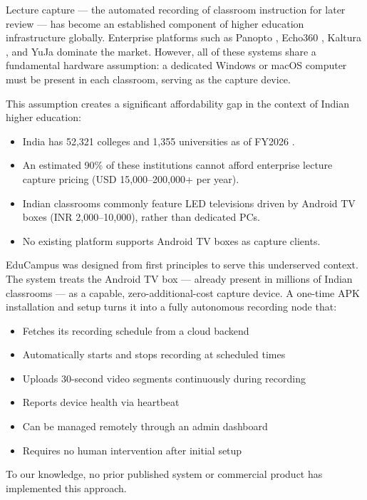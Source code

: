 \documentclass[12pt,a4paper]{article}
\begin{document}
Lecture capture — the automated recording of classroom instruction for later review — has become an established component of higher education infrastructure globally. Enterprise platforms such as Panopto \cite{panopto2024}, Echo360 \cite{echo360}, Kaltura \cite{kaltura}, and YuJa \cite{yuja} dominate the market. However, all of these systems share a fundamental hardware assumption: a dedicated Windows or macOS computer must be present in each classroom, serving as the capture device.

This assumption creates a significant affordability gap in the context of Indian higher education:

\begin{itemize}
    \item India has 52{,}321 colleges and 1{,}355 universities as of FY2026 \cite{ibef2024}.
    \item An estimated 90\% of these institutions cannot afford enterprise lecture capture pricing (USD 15{,}000--200{,}000+ per year).
    \item Indian classrooms commonly feature LED televisions driven by Android TV boxes (INR 2{,}000--10{,}000), rather than dedicated PCs.
    \item No existing platform supports Android TV boxes as capture clients.
\end{itemize}

EduCampus was designed from first principles to serve this underserved context. The system treats the Android TV box --- already present in millions of Indian classrooms --- as a capable, zero-additional-cost capture device. A one-time APK installation and setup turns it into a fully autonomous recording node that:

\begin{itemize}
    \item Fetches its recording schedule from a cloud backend
    \item Automatically starts and stops recording at scheduled times
    \item Uploads 30-second video segments continuously during recording
    \item Reports device health via heartbeat
    \item Can be managed remotely through an admin dashboard
    \item Requires no human intervention after initial setup
\end{itemize}

To our knowledge, no prior published system or commercial product has implemented this approach.
\end{document}
